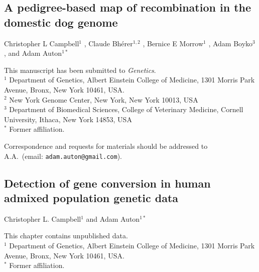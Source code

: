 \documentclass[11pt,twoside,openright,letterpaper]{memoir}
\begin{document}


\begin{SingleSpace}
\chapter{A pedigree-based map of recombination in the domestic dog genome} \label{ch:dogPed}

\noindent Christopher L Campbell$^1$ , Claude Bh\'{e}rer$^{1,2}$ , Bernice E Morrow$^1$ , Adam Boyko$^3$ , and Adam Auton$^{1*}$

\vspace{0.5cm}
\noindent This manuscript has been submitted to \textit{Genetics}. \\

\vspace{0.5cm}
\noindent $^1$ Department of Genetics, Albert Einstein College of Medicine, 1301 Morris Park Avenue, Bronx, New York 10461, USA. \\
\noindent $^2$ New York Genome Center, New York, New York 10013, USA \\
\noindent $^3$ Department of Biomedical Sciences, College of Veterinary Medicine, Cornell University, Ithaca, New York 14853, USA \\
\noindent $^*$ Former affiliation.

\vspace{0.5cm}
\begin{centering}
    Correspondence and requests for materials should be addressed to \\
    A.A.\ (email: \texttt{adam.auton@gmail.com}). \\
\end{centering}
\end{SingleSpace}



\begin{SingleSpace}
\chapter{Detection of gene conversion in human admixed population genetic data} \label{ch:geneConv}

\noindent Christopher L. Campbell$^1$ and Adam Auton$^{1*}$

\vspace{0.5cm}
\noindent This chapter contains unpublished data.\\

\vspace{0.5cm}
\noindent $^1$ Department of Genetics, Albert Einstein College of Medicine, 1301 Morris Park Avenue, Bronx, New York 10461, USA. \\
\noindent $^*$ Former affiliation.
\end{SingleSpace}
\end{document}
